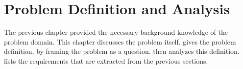 \chapter{Problem Definition and Analysis}
\label{cha:probl-defin-analys}

The previous chapter provided the necessary background knowledge of the problem
domain. This chapter discusses the problem itself. 
gives the problem definition, by framing the problem as a question.
 then analyzes this definition.
 lists the requirements that are extracted from
the previous sections.





